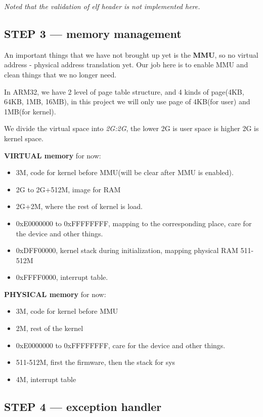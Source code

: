 \documentclass{article}
\begin{document}
\emph{Noted that the validation of elf header is not implemented here.}

\subsection{STEP 3 --- memory management}

An important things that we have not brought up yet is the \textbf{MMU}, so no virtual address - physical address translation yet. Our job here is to enable MMU and clean things that we no longer need.

In ARM32, we have 2 level of page table structure, and 4 kinds of page(4KB, 64KB, 1MB, 16MB), in this project we will only use page of 4KB(for user) and 1MB(for kernel).

We divide the virtual space into \emph{2G:2G}, the lower 2G is user space is higher 2G is kernel space.

\textbf{VIRTUAL memory} for now:
\begin{itemize}
	\item 3M, code for kernel before MMU(will be clear after MMU is enabled).
	\item	2G to 2G+512M, image for RAM
	\item	2G+2M, where the rest of kernel is load.
	\item	0xE0000000 to 0xFFFFFFFF, mapping to the corresponding place, care for the device and other things.
	\item	0xDFF00000, kernel stack during initialization, mapping physical RAM 511-512M
	\item	0xFFFF0000, interrupt table.
\end{itemize}

\textbf{PHYSICAL memory} for now:
\begin{itemize}
	\item 3M, code for kernel before MMU
	\item	2M, rest of the kernel
	\item	0xE0000000 to 0xFFFFFFFF, care for the device and other things.
	\item	511-512M, first the firmware, then the stack for sys
	\item	4M, interrupt table
\end{itemize}

\subsection{STEP 4 --- exception handler}
\end{document}
